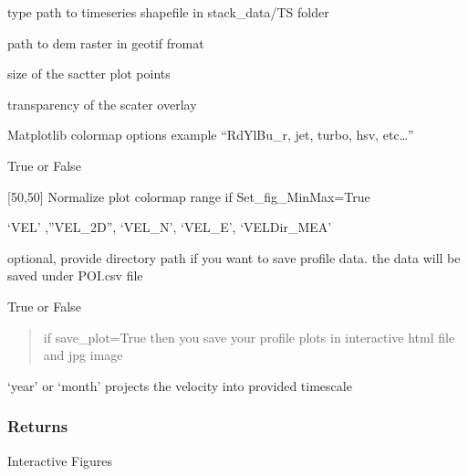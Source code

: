 \documentclass[letterpaper,10pt]{sphinxmanual}
\begin{document}
\begin{fulllineitems}
\begin{description}
\sphinxAtStartPar
type path to timeseries shapefile in stack\_data/TS folder

\sphinxAtStartPar
path to dem raster in geotif fromat

\sphinxAtStartPar
size of the sactter plot points

\sphinxAtStartPar
transparency of the scater overlay

\sphinxAtStartPar
Matplotlib colormap options example “RdYlBu\_r, jet, turbo, hsv, etc…”

\sphinxAtStartPar
True or False

\sphinxAtStartPar
{[}\sphinxhyphen{}50,50{]}  Normalize plot colormap range if Set\_fig\_MinMax=True

\sphinxAtStartPar
‘VEL’ ,”VEL\_2D”, ‘VEL\_N’, ‘VEL\_E’, ‘VELDir\_MEA’

\sphinxAtStartPar
optional, provide directory path if you want to save profile data.
the data will be saved under POI.csv file

\sphinxAtStartPar
True or False

\begin{quote}

\sphinxAtStartPar
if save\_plot=True then
you save your profile plots in interactive html file and jpg image
\end{quote}
\begin{description}
\sphinxAtStartPar
‘year’ or ‘month’ projects the velocity into provided time\sphinxhyphen{}scale

\end{description}

\end{description}


\subsubsection{Returns}
\label{\detokenize{generated/akhdefo_functions.akhdefo_ts_plot:returns}}
\sphinxAtStartPar
Interactive Figures

\end{fulllineitems}
\end{document}
